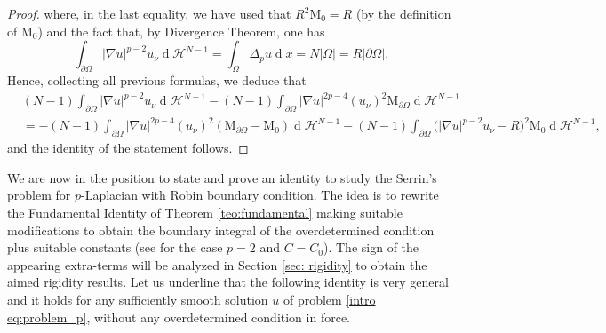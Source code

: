 \documentclass[10pt,a4paper]{amsart}
\numberwithin{equation}{section}
\renewcommand{\d}[1]{\ensuremath{\operatorname{d}\!{#1}}}
\begin{document}
\begin{proof}
    where, in the last equality, we have used that $R^2 \mathrm{M}_{0} = R$ (by the definition of $\mathrm{M}_0$) and the fact that, by Divergence Theorem, one has
    \begin{equation}\label{eq: boundary int of u_nu = N Omega}
        \int_{\partial\Omega} |\nabla u|^{p-2} u_\nu \d{}\mathcal{H}^{N-1} = \int_{\Omega} \Delta_p u \d{}x = N|\Omega| = R |\partial\Omega|. 
    \end{equation}
    Hence, collecting all previous formulas, we deduce that
    \begin{equation*}
    \begin{aligned}
        &(N-1) \int_{\partial\Omega} |\nabla u|^{p-2} u_\nu \d{}\mathcal{H}^{N-1} - (N-1) \int_{\partial\Omega} |\nabla u|^{2p-4} (u_\nu)^2 \mathrm{M}_{\partial\Omega} \d{}\mathcal{H}^{N-1}
        \\
        &= - (N-1) \int_{\partial\Omega} |\nabla u|^{2p-4} (u_\nu)^2 (\mathrm{M}_{\partial\Omega} - \mathrm{M}_{0} ) \d{}\mathcal{H}^{N-1}   - (N-1) \int_{\partial\Omega} \Big(|\nabla u|^{p-2} u_\nu - R \Big)^2  \mathrm{M}_{0} \d{}\mathcal{H}^{N-1},
    \end{aligned}
    \end{equation*}
    and the identity of the statement follows.
\end{proof}
    
We are now in the position to state and prove an identity to study the Serrin's problem for $p$-Laplacian with Robin boundary condition. The idea is to rewrite the Fundamental Identity of Theorem \ref{teo:fundamental} making suitable modifications to obtain the boundary integral of the overdetermined condition plus suitable constants (see \cite[Thm. 5]{gamo26} for the case $p=2$ and $C=C_0$). The sign of the appearing extra-terms will be analyzed in Section \ref{sec: rigidity} to obtain the aimed rigidity results. Let us underline that the following identity is very general and it holds for any sufficiently smooth solution $u$ of problem \eqref{intro eq:problem_p}, without any overdetermined condition in force.
\end{document}
